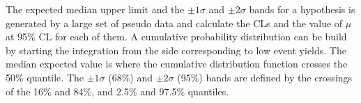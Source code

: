 The expected median upper limit and the $\pm 1\sigma$ and $\pm 2 \sigma$ bands for a hypothesis is generated by a large set of pseudo data and calculate the CLs and the value of $\mu$ at 95\% CL for each of them. A cumulative probability distribution can be build by starting the integration from the side corresponding to low event yields. The median expected value is where the cumulative distribution function crosses the 50\% quantile. The $\pm 1 \sigma$ (68\%)  and $\pm 2\sigma$ (95\%) bands are defined by the crossings of the 16\% and 84\%, and 2.5\% and 97.5\% quantiles.

